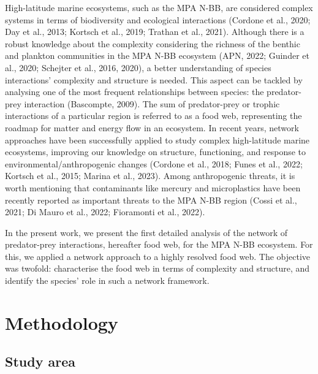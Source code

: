 \documentclass[preprint, 3p,
authoryear]{elsarticle} %
\begin{document}
High-latitude marine ecosystems, such as the MPA N-BB, are considered
complex systems in terms of biodiversity and ecological interactions
(Cordone et al., 2020; Day et al., 2013; Kortsch et al., 2019; Trathan
et al., 2021). Although there is a robust knowledge about the complexity
considering the richness of the benthic and plankton communities in the
MPA N-BB ecosystem (APN, 2022; Guinder et al., 2020; Schejter et al.,
2016, 2020), a better understanding of species interactions' complexity
and structure is needed. This aspect can be tackled by analysing one of
the most frequent relationships between species: the predator-prey
interaction (Bascompte, 2009). The sum of predator-prey or trophic
interactions of a particular region is referred to as a food web,
representing the roadmap for matter and energy flow in an ecosystem. In
recent years, network approaches have been successfully applied to study
complex high-latitude marine ecosystems, improving our knowledge on
structure, functioning, and response to environmental/anthropogenic
changes (Cordone et al., 2018; Funes et al., 2022; Kortsch et al., 2015;
Marina et al., 2023). Among anthropogenic threats, it is worth
mentioning that contaminants like mercury and microplastics have been
recently reported as important threats to the MPA N-BB region (Cossi et
al., 2021; Di Mauro et al., 2022; Fioramonti et al., 2022).

In the present work, we present the first detailed analysis of the
network of predator-prey interactions, hereafter food web, for the MPA
N-BB ecosystem. For this, we applied a network approach to a highly
resolved food web. The objective was twofold: characterise the food web
in terms of complexity and structure, and identify the species' role in
such a network framework.

\hypertarget{methodology}{%
\section{Methodology}\label{methodology}}

\hypertarget{study-area}{%
\subsection{Study area}\label{study-area}}
\end{document}
